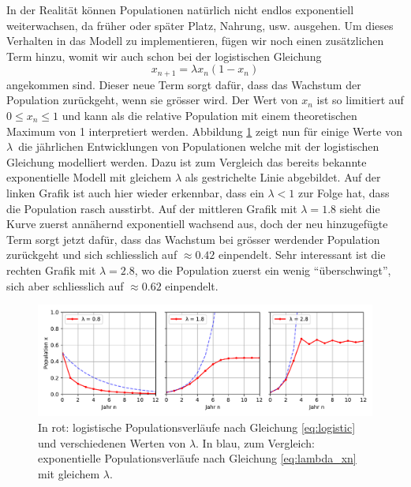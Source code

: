 In der Realität können Populationen natürlich nicht endlos
exponentiell weiterwachsen, 
da früher oder später Platz, Nahrung, usw. ausgehen.
Um dieses Verhalten in das Modell zu implementieren,
fügen wir noch einen zusätzlichen Term hinzu, 
womit wir auch schon bei der logistischen Gleichung 
\begin{equation}
    \label{eq:logistic}
    x_{n+1} = \lambda x_{n} (1 - x_{n})
\end{equation}
angekommen sind.
Dieser neue Term sorgt dafür, 
dass das Wachstum der Population zurückgeht, 
wenn sie grösser wird.
Der Wert von $x_n$ ist so limitiert auf 
$0 \le x_n \le 1$  
und kann als die relative Population mit einem
theoretischen Maximum von 1 interpretiert werden. 
Abbildung \ref{fig:pop_logistic} zeigt nun
für einige Werte von $\lambda$\
die jährlichen Entwicklungen von Populationen 
welche mit der logistischen Gleichung modelliert werden.
Dazu ist zum Vergleich das bereits bekannte exponentielle Modell
mit gleichem $\lambda$ als gestrichelte Linie abgebildet. 
Auf der linken Grafik ist auch hier wieder erkennbar, 
dass ein $\lambda < 1$ zur Folge hat, 
dass die Population rasch ausstirbt. 
Auf der mittleren Grafik mit $\lambda = 1.8$ sieht 
die Kurve zuerst annähernd exponentiell wachsend aus,
doch der neu hinzugefügte Term sorgt jetzt dafür, 
dass das Wachstum bei grösser werdender Population zurückgeht 
und sich schliesslich auf $\approx 0.42$ einpendelt. 
Sehr interessant ist die rechten Grafik mit $\lambda = 2.8$,
wo die Population zuerst ein wenig ``überschwingt'', 
sich aber schliesslich auf $\approx 0.62$ einpendelt.  
\begin{figure}
    \includegraphics[width=\linewidth]{papers/logistic/figures/pop_logistic.pdf}
    \caption{
        In rot:
        logistische Populationsverläufe nach
        Gleichung \eqref{eq:logistic} und
        verschiedenen Werten von $\lambda$.
        In blau, zum Vergleich:
        exponentielle Populationsverläufe nach 
        Gleichung \eqref{eq:lambda_xn} mit gleichem $\lambda$.
    }
    \label{fig:pop_logistic}
\end{figure}
